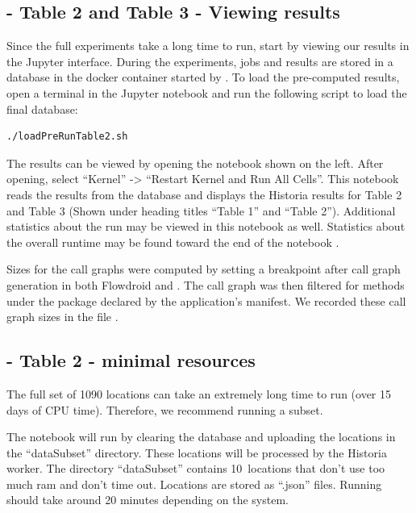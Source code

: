 \documentclass{acmart} %
\begin{document}

\subsection{ - Table 2 and Table 3 - Viewing results}

Since the full experiments take a long time to run, start by viewing our results in the Jupyter interface.
During the experiments, jobs and results are stored in a database in the  docker container started by .
To load the pre-computed results, open a terminal in the Jupyter notebook and run the following script to load the final database:

\begin{lstlisting}[language=bash]
    ./loadPreRunTable2.sh
\end{lstlisting}

The results can be viewed by opening the notebook  shown on the left.  After opening, select ``Kernel'' -> ``Restart Kernel and Run All Cells''.
This notebook reads the results from the database and displays the Historia results for Table 2 and Table 3 (Shown under heading titles ``Table 1'' and ``Table 2''). Additional statistics about the run may be viewed in this notebook as well. Statistics about the overall runtime may be found toward the end of the notebook .

Sizes for the call graphs were computed by setting a breakpoint after call graph generation in both Flowdroid and \toolname.  The call graph was then filtered for methods under the package declared by the application's manifest.  We recorded these call graph sizes in the file .

\subsection{ - Table 2 - minimal resources}

\newcommand{\numsubset}{10}
The full set of 1090 locations can take an extremely long time to run (over 15 days of CPU time).  Therefore, we recommend running a subset.


The notebook  will run by clearing the database and uploading the locations in the ``dataSubset'' directory.  These locations will be processed by the Historia worker.  
The directory ``dataSubset'' contains \numsubset~locations that don't use too much ram and don't time out.  Locations are stored as ``.json'' files.
Running should take around 20 minutes depending on the system.
\end{document}
